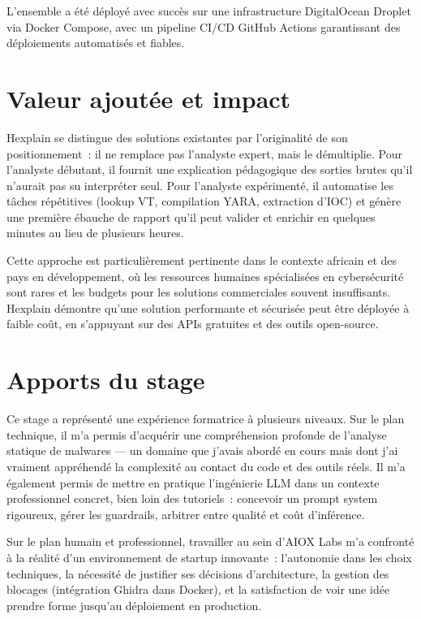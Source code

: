 L'ensemble a été déployé avec succès sur une infrastructure DigitalOcean Droplet via Docker Compose, avec un pipeline CI/CD GitHub Actions garantissant des déploiements automatisés et fiables.

\section*{Valeur ajoutée et impact}

Hexplain se distingue des solutions existantes par l'originalité de son positionnement~: il ne remplace pas l'analyste expert, mais le démultiplie. Pour l'analyste débutant, il fournit une explication pédagogique des sorties brutes qu'il n'aurait pas su interpréter seul. Pour l'analyste expérimenté, il automatise les tâches répétitives (lookup VT, compilation YARA, extraction d'IOC) et génère une première ébauche de rapport qu'il peut valider et enrichir en quelques minutes au lieu de plusieurs heures.

Cette approche est particulièrement pertinente dans le contexte africain et des pays en développement, où les ressources humaines spécialisées en cybersécurité sont rares et les budgets pour les solutions commerciales souvent insuffisants. Hexplain démontre qu'une solution performante et sécurisée peut être déployée à faible coût, en s'appuyant sur des APIs gratuites et des outils open-source.

\section*{Apports du stage}

Ce stage a représenté une expérience formatrice à plusieurs niveaux. Sur le plan technique, il m'a permis d'acquérir une compréhension profonde de l'analyse statique de malwares --- un domaine que j'avais abordé en cours mais dont j'ai vraiment appréhendé la complexité au contact du code et des outils réels. Il m'a également permis de mettre en pratique l'ingénierie LLM dans un contexte professionnel concret, bien loin des tutoriels~: concevoir un prompt system rigoureux, gérer les guardrails, arbitrer entre qualité et coût d'inférence.

Sur le plan humain et professionnel, travailler au sein d'AIOX Labs m'a confronté à la réalité d'un environnement de startup innovante~: l'autonomie dans les choix techniques, la nécessité de justifier ses décisions d'architecture, la gestion des blocages (intégration Ghidra dans Docker), et la satisfaction de voir une idée prendre forme jusqu'au déploiement en production.

